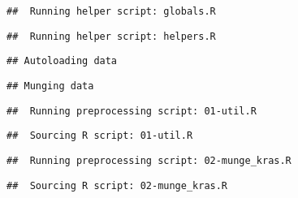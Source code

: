 \documentclass[
]{article}
\begin{document}
\begin{verbatim}
##  Running helper script: globals.R
\end{verbatim}

\begin{verbatim}
##  Running helper script: helpers.R
\end{verbatim}

\begin{verbatim}
## Autoloading data
\end{verbatim}

\begin{verbatim}
## Munging data
\end{verbatim}

\begin{verbatim}
##  Running preprocessing script: 01-util.R
\end{verbatim}

\begin{verbatim}
##  Sourcing R script: 01-util.R
\end{verbatim}

\begin{verbatim}
##  Running preprocessing script: 02-munge_kras.R
\end{verbatim}

\begin{verbatim}
##  Sourcing R script: 02-munge_kras.R
\end{verbatim}
\end{document}
